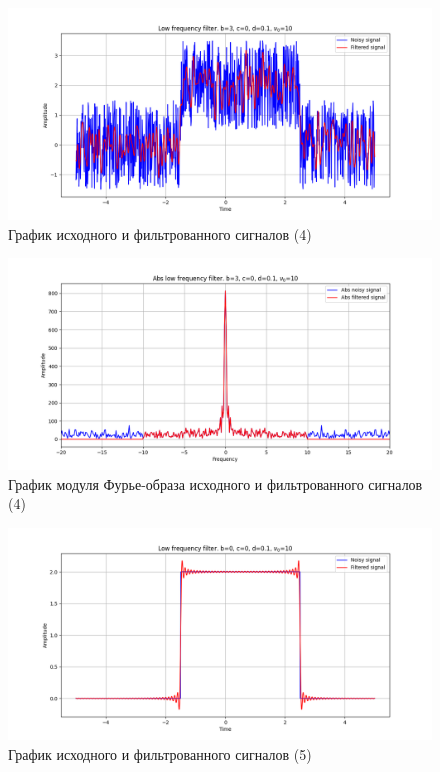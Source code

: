 \documentclass[a4paper, 12pt]{article}
\begin{document}
    \begin{figure}[!htb]
        \centering
        \includegraphics[scale=0.48]{5_u_flt_u_nohigh.png}
        \captionsetup{skip=0pt}
        \caption{График исходного и фильтрованного сигналов (4)}
        \label{fig:fig7}
    \end{figure}
    \begin{figure}[!htb]
        \centering
        \includegraphics[scale=0.48]{5_abs_u_U_nohigh.png}
        \captionsetup{skip=0pt}
        \caption{График модуля Фурье-образа исходного и фильтрованного сигналов (4)}
        \label{fig:fig8}
    \end{figure}
    \begin{figure}[!htb]
        \centering
        \includegraphics[scale=0.48]{4_u_flt_u_nohigh.png}
        \captionsetup{skip=0pt}
        \caption{График исходного и фильтрованного сигналов (5)}
        \label{fig:fig9}
    \end{figure}
\end{document}
